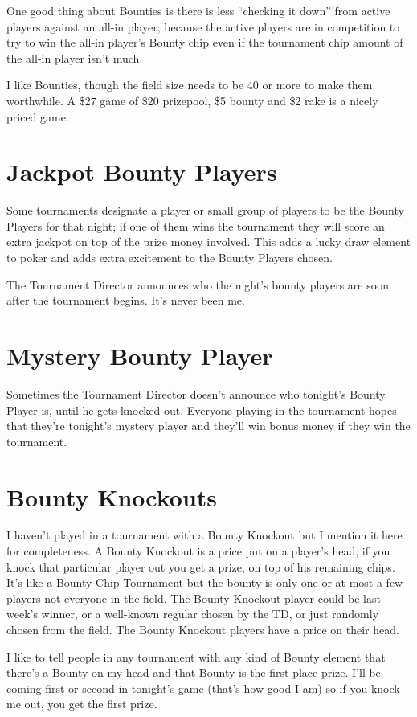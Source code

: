 One good thing about Bounties is there is less ``checking it down''
from active players against an all-in player; because the active
players are in competition to try to win the all-in player's
Bounty chip even if the tournament chip amount of the all-in player
isn't much.

I like Bounties, though the field size needs to be 40 or more to
make them worthwhile. A \$27 game of \$20 prizepool, \$5 bounty
and \$2 rake is a nicely priced game.

\section{Jackpot Bounty Players}

Some tournaments designate a player or small group of players
to be the Bounty Players for that night; if one of them wins
the tournament they will score an extra jackpot on top of
the prize money involved. This adds a lucky draw element to
poker and adds extra excitement to the Bounty Players chosen.

The Tournament Director announces who the night's bounty players
are soon after the tournament begins. It's never been me.

\section{Mystery Bounty Player}

Sometimes the Tournament Director doesn't announce who tonight's
Bounty Player is, until he gets knocked out. Everyone playing in the
tournament hopes that they're tonight's mystery player and they'll
win bonus money if they win the tournament.

\section{Bounty Knockouts}

I haven't played in a tournament with a Bounty Knockout but I
mention it here for completeness. A Bounty Knockout is a price
put on a player's head, if you knock that particular player out
you get a prize, on top of his remaining chips. It's like a
Bounty Chip Tournament but the bounty is only one or at most
a few players not everyone in the field. The Bounty Knockout player
could be last week's winner, or a well-known regular chosen
by the TD, or just randomly chosen from the field. The Bounty Knockout
players have a price on their head.

I like to tell people in any tournament with any kind of Bounty
element that there's a Bounty on my head and that Bounty is the first
place prize. I'll be coming first or second in tonight's game (that's
how good I am) so if you knock me out, you get the first prize.


